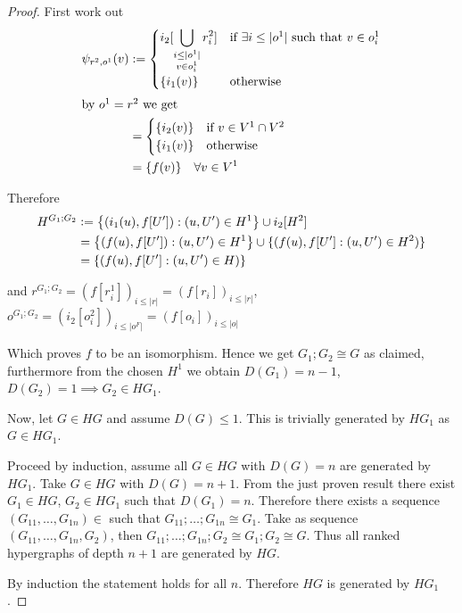 \documentclass[12pt]{article}
\theoremstyle{definition}
\newcommand{\defeq}{\vcentcolon=}
\newcommand{\1}{\mathbbm{1}}
\begin{document}
\begin{proof}
    First work out
    \begin{align*}
        \psi_{r^2, o^1}(v) &:= 
        \begin{cases}
            i_2[\displaystyle\bigcup_{\substack{i\leq |o^1| \\ v \in o^1_i}} r^2_i]& \text{if } \exists i \leq |o^1| \text{ such that } v \in o^1_i \\
            \{i_1(v)\} & \text{otherwise}
        \end{cases}\\
        \intertext{by $o^1=r^2$ we get}
        &=
        \begin{cases}
            \{i_2(v)\} & \text{if } v\in V^1\cap V^2\\
            \{i_1(v)\} & \text{otherwise}
        \end{cases}\\
        &= \{f(v)\} \quad \forall v\in V^1
    \end{align*}

    Therefore
    \begin{align*}
        H^{G_1;G_2} &\defeq \left\{ \left(i_1(u), f[U']\right) : (u, U') \in H^1 \right\} \cup i_2[H^2]\\
        &= \left\{ \left(f(u), f[U']\right) : (u, U') \in H^1 \right\} \cup \{(f(u), f[U'] : (u,U')\in H^2)\}\\
        &= \{(f(u), f[U'] : (u,U')\in H)\}\\
    \end{align*}

    and $r^{G_1;G_2} = (f[r^1_i])_{i\leq |r|} = (f[r_i])_{i\leq |r|}$, $o^{G_1;G_2} = (i_2[o_i^2])_{i\leq |o^F|} = (f[o_i])_{i\leq |o|}$

    Which proves $f$ to be an isomorphism. Hence we get $G_1;G_2 \cong G$ as claimed, furthermore from the chosen $H^1$ we obtain $D(G_1) = n-1$, $D(G_2) = 1 \implies G_2\in HG_1$.

    Now, let $G\in HG$ and assume $D(G) \leq 1$. This is trivially generated by $HG_1$ as $G\in HG_1$.

    Proceed by induction, assume all $G\in HG$ with $D(G) = n$ are generated by $HG_1$. Take $G\in HG$ with $D(G) = n+1$. From the just proven result there exist $G_1\in HG$, $G_2\in HG_1$ such that $D(G_1) = n$. Therefore there exists a sequence $(G_{11}, \dots, G_{1n}) \in $ such that $G_{11};\dots;G_{1n}\cong G_1$. Take as sequence $(G_{11}, \dots, G_{1n}, G_2)$, then $G_11; \dots; G_{1n}; G_2 \cong G_1; G_2 \cong G$. Thus all ranked hypergraphs of depth $n+1$ are generated by $HG$.

    By induction the statement holds for all $n$. Therefore $HG$ is generated by $HG_1$.
\end{proof}
\end{document}
